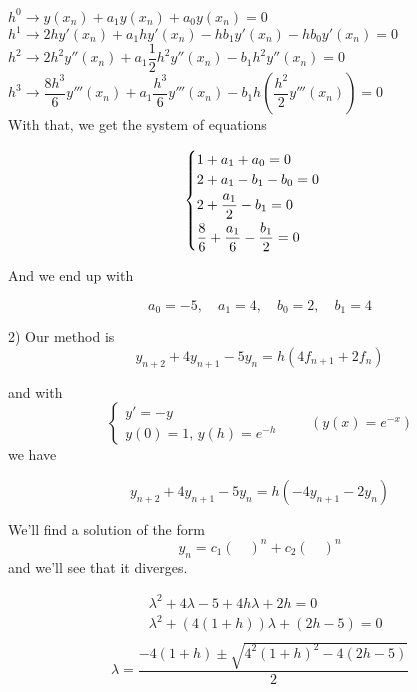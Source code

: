 \begin{example}
    $h^0 \longrightarrow y(x_n) + a_1y(x_n) + a_0y(x_n) = 0$ \\
    
    $h^1 \longrightarrow 2hy'(x_n) + a_1hy'(x_n) - hb_1y'(x_n) - hb_0y'(x_n) = 0$ \\
    
    $h^2 \longrightarrow 2h^2y''(x_n) + a_1\dfrac{1}{2}h^2y''(x_n) - b_1h^2y''(x_n) = 0$\\
    
    $h^3 \longrightarrow \dfrac{8h^3}{6}y'''(x_n) + a_1\dfrac{h^3}{6}y'''(x_n) - b_1h\left(\dfrac{h^2}{2}y'''(x_n)\right) = 0$ \\
    
    With that, we get the system of equations
    
    $$
      \begin{cases}
        1 + a_1 + a_0 = 0\\
        2 + a_1 - b_1 - b_0 = 0 \vspace{0.1cm}\\
        2 + \dfrac{a_1}{2} - b_1 = 0 \vspace{0.1cm}\\
        \dfrac{8}{6} + \dfrac{a_1}{6} - \dfrac{b_1}{2} = 0
      \end{cases}
    $$
    
    And we end up with
    
    \[
      a_0 = -5, \quad a_1 = 4, \quad b_0 = 2, \quad b_1 = 4
    \]
    
    \newpage
    
    2)  Our method is 
    $$y_{n+2} + 4y_{n+1} - 5y_n = h(4f_{n+1} + 2f_n)$$
    
    and with $$\begin{cases}y' = -y \\y(0) = 1, \, y(h) = e^{-h} \end{cases} \qquad (y(x) = e^{-x})$$ we have
    
    \[
      y_{n+2} + 4y_{n+1} - 5y_n = h(-4y_{n+1} - 2y_n)
    \]
    
    We'll find a solution of the form $$y_n = c_1(\quad)^n + c_2(\quad)^n$$ and we'll see that it diverges.
    
    \begin{align*}
      &\lambda^2 + 4\lambda - 5 + 4h\lambda + 2h = 0\\
      &\lambda^2 + (4(1+h))\lambda + (2h-5) = 0\\
    \end{align*}
    \[
      \lambda = \frac{-4(1+h) \pm \sqrt{4^2(1+h)^2 - 4(2h-5)}}{2}
    \]
    

\end{example}
